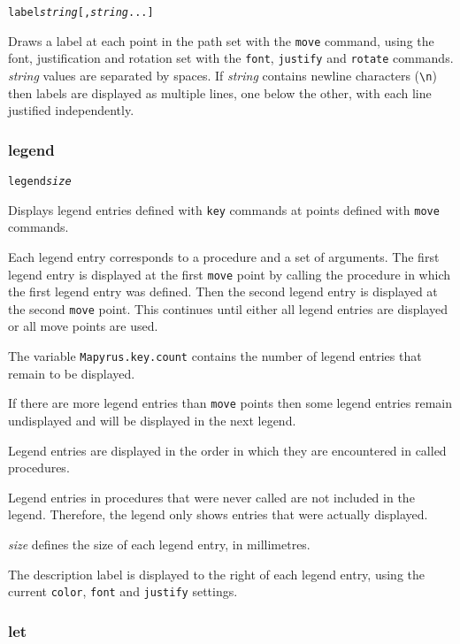\begin{alltt}
label \textit{string} [, \textit{string} ...]
\end{alltt}

Draws a label at each point in the path set with the \texttt{move} command,
using the font, justification and rotation set with the \texttt{font},
\texttt{justify} and \texttt{rotate} commands.  \textit{string} values are
separated by spaces.  If \textit{string} contains newline characters
(\texttt{\textbackslash{}n}) then labels are displayed as multiple lines, one
below the other, with each line justified independently.

\subsubsection{legend}

\begin{alltt}
legend \textit{size}
\end{alltt}

Displays legend entries defined with
\texttt{key} commands at points defined with
\texttt{move} commands.

Each legend entry corresponds to a procedure and a set of arguments.  The first
legend entry is displayed at the first \texttt{move} point by calling the
procedure in which the first legend entry was defined.  Then the second legend
entry is displayed at the second \texttt{move} point.  This continues until
either all legend entries are displayed or all move points are used.

The variable
\texttt{Mapyrus.key.count}
contains the number of legend entries that remain to be displayed.

If there are more legend entries than 
\texttt{move} points then some legend entries
remain undisplayed and will be displayed in the next legend.

Legend entries are displayed in the order in which they
are encountered in called procedures.

Legend entries in procedures that were never called are
not included in the legend.  Therefore, the legend only shows
entries that were actually displayed.

\textit{size} defines the size of each legend entry, in millimetres.

The description label is displayed to the right of each legend entry, using the
current \texttt{color}, \texttt{font} and \texttt{justify} settings.

\subsubsection{let}

